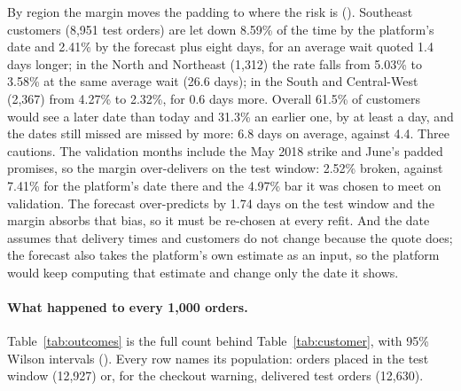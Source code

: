 By region the margin moves the padding to where the risk is
(). Southeast
customers (8{,}951 test orders)
are let down 8.59\% of the time by the platform's date and 2.41\% by the forecast
plus eight days, for an average wait quoted 1.4 days longer; in the North and
Northeast (1{,}312) the rate falls from 5.03\% to 3.58\% at the same average wait
(26.6 days); in the South and Central-West (2{,}367) from 4.27\% to 2.32\%, for
0.6 days more. Overall 61.5\% of customers would see a later date than today and
31.3\% an earlier one, by at least a day, and the dates still missed are missed
by more: 6.8 days on average, against 4.4. Three cautions. The validation months
include the May 2018 strike and June's padded promises, so the margin
over-delivers on the test window: 2.52\% broken, against 7.41\% for the
platform's date there and the 4.97\% bar it was chosen to meet on validation.
The forecast over-predicts by 1.74 days on the test window and the margin
absorbs that bias, so it must be re-chosen at every refit. And the date assumes
that delivery times and customers do not change because the quote does; the
forecast also takes the platform's own estimate as an input, so the platform
would keep computing that estimate and change only the date it shows.

\paragraph{What happened to every 1{,}000 orders.} Table~\ref{tab:outcomes} is
the full count behind Table~\ref{tab:customer}, with 95\% Wilson intervals
(). Every row names its population: orders
placed in the test window (12{,}927) or, for the checkout warning, delivered test
orders (12{,}630).

